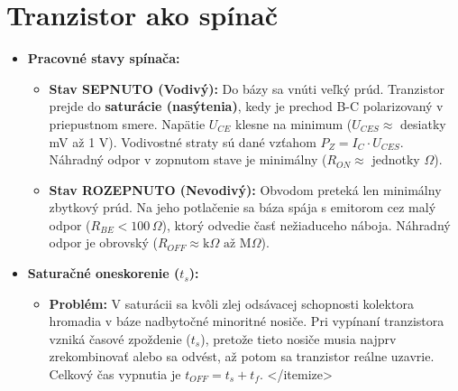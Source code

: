 \section{Tranzistor ako spínač}
\begin{itemize}
	\item \textbf{Pracovné stavy spínača:}
	\begin{itemize}
		\item \textbf{Stav SEPNUTO (Vodivý):} Do bázy sa vnúti veľký prúd. Tranzistor prejde do \textbf{saturácie (nasýtenia)}, kedy je prechod B-C polarizovaný v priepustnom smere. Napätie $U_{CE}$ klesne na minimum ($U_{CES} \approx$ desiatky mV až 1 V). Vodivostné straty sú dané vzťahom $P_Z = I_C \cdot U_{CES}$. Náhradný odpor v zopnutom stave je minimálny ($R_{ON} \approx$ jednotky $\Omega$).
		\item \textbf{Stav ROZEPNUTO (Nevodivý):} Obvodom preteká len minimálny zbytkový prúd. Na jeho potlačenie sa báza spája s emitorom cez malý odpor ($R_{BE} < 100\,\Omega$), ktorý odvedie časť nežiaduceho náboja. Náhradný odpor je obrovský ($R_{OFF} \approx \text{k}\Omega \text{ až M}\Omega$).
	\end{itemize}
	
	\item \textbf{Saturačné oneskorenie ($t_s$):}
	\begin{itemize}
		\item \textbf{Problém:} V saturácii sa kvôli zlej odsávacej schopnosti kolektora hromadia v báze nadbytočné minoritné nosiče. Pri vypínaní tranzistora vzniká časové zpoždenie ($t_s$), pretože tieto nosiče musia najprv zrekombinovať alebo sa odvést, až potom sa tranzistor reálne uzavrie. Celkový čas vypnutia je $t_{OFF} = t_s + t_f$.
		</itemize>
		

\end{itemize}
\end{itemize}
